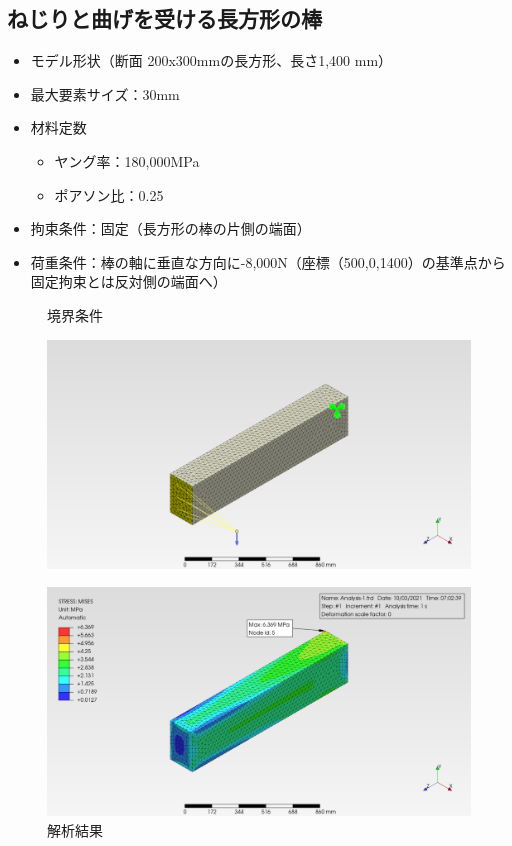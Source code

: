 \documentclass[a4j,20pt,slide]{ltjsarticle}
\begin{document}
\subsection{ねじりと曲げを受ける長方形の棒}
\begin{itemize}
	\item モデル形状（断面 200x300mmの長方形、長さ1,400 mm）
	\item 最大要素サイズ：30mm
	\item 材料定数
	      \begin{itemize}
		      \item ヤング率：180,000MPa
		      \item ポアソン比：0.25
	      \end{itemize}
	\item 拘束条件：固定（長方形の棒の片側の端面）
	\item 荷重条件：棒の軸に垂直な方向に-8,000N（座標（500,0,1400）の基準点から固定拘束とは反対側の端面へ）
\end{itemize}
\vspace{-\baselineskip}
\begin{figure}[H]
	\begin{minipage}{.49\hsize}
		\caption{境界条件}
		\label{04-01}
		\centering
		\includegraphics[width=.95\columnwidth]{fig/04-01.png}
	\end{minipage}
	\begin{minipage}{.49\hsize}
		\caption{解析結果}
		\label{04-02}
		\centering
		\includegraphics[width=.95\columnwidth]{fig/04-02.png}
	\end{minipage}
\end{figure}
\clearpage
%
\end{document}
